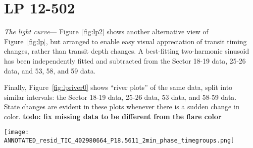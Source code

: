 \documentclass[11pt,twocolumn,tighten]{aastex63}
\begin{document}
\section{LP 12-502}
\label{app:lp}

{\it The light curve}---
Figure~\ref{fig:lp2} shows another alternative view of
Figure~\ref{fig:lp}, but arranged to enable easy visual appreciation
of transit timing changes, rather than transit depth changes.  A
best-fitting two-harmonic sinusoid has been independently fitted and
subtracted from the Sector 18-19 data, 25-26 data, and 53, 58, and 59
data.

Finally, Figure~\ref{fig:lpriver0} shows ``river plots'' of the
same data, split into similar intervals:
the Sector 18-19 data, 25-26 data, 53 data, and 58-59 data.
State changes are evident in these plots whenever there is a sudden
change in color.
{\bf todo: fix missing data to be different from the flare color} 


\begin{figure*}[!t]
	\begin{center}
    \texttt{[image: ANNOTATED\_resid\_TIC\_402980664\_P18.5611\_2min\_phase\_timegroups.png]}
    	\end{center}
    \vspace{-0.4cm}
		\caption{
	      {\bf Alternative view of the evolution of LP 12-502}
	      (Figure~\ref{fig:lp}), arranged to emphasize changes in transit
	      times.  There are 200 binned black points per cycle; a two-harmonic
	      sinusoid has been subtracted over specific chunks in time ({\bf see text}).
	      Vertical gray lines are underplotted to help guide the eye to instances
	      in which preferred dip phases synchronize over long baselines.
	      The orange and green lines guide the eye to where dips
	      appear to change the positions of their local minima.
		}
		\label{fig:lp2}
\end{figure*}
\end{document}
